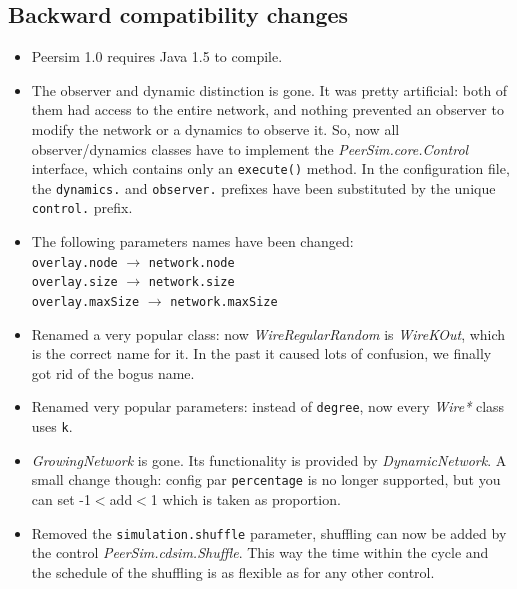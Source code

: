\documentclass[a4paper,11pt]{article}
\begin{document}
\subsection{Backward compatibility changes}
\label{s:comp_change}

\begin{itemize}

\item Peersim 1.0 requires Java 1.5 to compile.

\item The observer and dynamic distinction is gone. It was pretty artificial:
  both of them had access to the entire network, and nothing prevented
  an observer to modify the network or a dynamics to observe it. So,
  now all observer/dynamics classes have to implement the 
  \emph{PeerSim.core.Control} interface, which contains only an
  \texttt{execute()} 
  method. In the configuration file, the \texttt{dynamics.} and
  \texttt{observer.} 
  prefixes have been substituted by the unique \texttt{control.} prefix. 

\item The following parameters names have been changed:\\
  \texttt{overlay.node} $\to$ \texttt{network.node}\\
  \texttt{overlay.size} $\to$ \texttt{network.size}\\
  \texttt{overlay.maxSize} $\to$ \texttt{network.maxSize}

\item Renamed a very popular class: now \emph{WireRegularRandom} is
  \emph{WireKOut}, which 
  is the correct name for it. In the past it caused lots of confusion, we
  finally got rid of the bogus name.

\item Renamed very popular parameters: instead of \texttt{degree}, now
  every \emph{Wire*}  
  class uses \texttt{k}.

\item \emph{GrowingNetwork} is gone. Its functionality is provided by 
  \emph{DynamicNetwork}. A small change though: config par
  \texttt{percentage} is no longer  
  supported, but you can set -1$<$add$<$1 which is taken as proportion.

\item Removed the \texttt{simulation.shuffle} parameter, shuffling can now be
  added by the control \emph{PeerSim.cdsim.Shuffle}. This way the time
  within the cycle and 
  the schedule of the shuffling is as flexible as for any other control.


\end{itemize}
\end{document}
